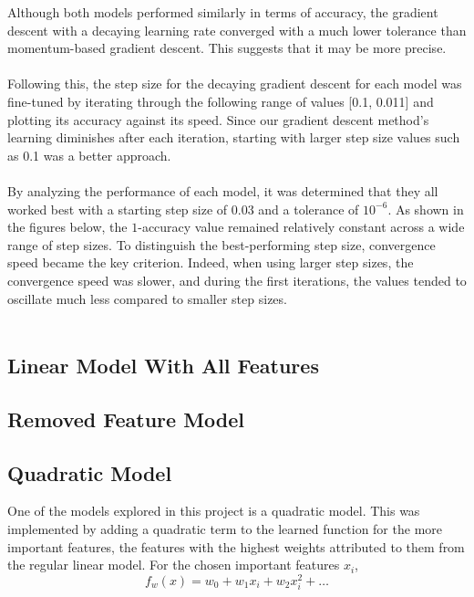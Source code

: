 \documentclass{article}
\begin{document}
Although both models performed similarly in terms of accuracy, the gradient descent with a decaying learning rate converged with a much lower tolerance than momentum-based gradient descent. This suggests that it may be more precise.
\\
\\
Following this, the step size for the decaying gradient descent for each model was fine-tuned by iterating through the following range of values [0.1, 0.011] and plotting its accuracy against its speed. Since our gradient descent method’s learning diminishes after each iteration, starting with larger step size values such as 0.1 was a better approach.
\\
\\
By analyzing the performance of each model, it was determined that they all worked best with a starting step size of 0.03 and a tolerance of \( 10^{-6} \). As shown in the figures below, the \( 1 \)-accuracy value remained relatively constant across a wide range of step sizes. To distinguish the best-performing step size, convergence speed became the key criterion. Indeed, when using larger step sizes, the convergence speed was slower, and during the first iterations, the values tended to oscillate much less compared to smaller step sizes.
\\
\\
\subsection{Linear Model With All Features}

\subsection{Removed Feature Model}

\subsection{Quadratic Model}

One of the models explored in this project is a quadratic model.  This was implemented by adding a quadratic term to the learned function for the more important features, the features with the highest weights attributed to them from the regular linear model.  For the chosen important features $x_i$, 
\begin{equation}
   f_w(x) = w_0 + w_1 x_i + w_2 x_i^2 + \dots
\end{equation}
\end{document}
